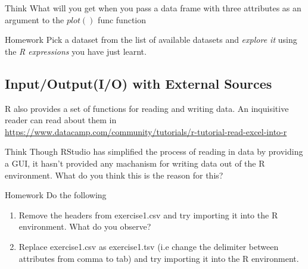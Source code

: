 \begin{DIY}{Think}
What will you get when you pass a data frame with three attributes as an argument to the $plot()$ func function
\end{DIY}

\begin{DIY}{Homework}
Pick a dataset from the list of available datasets and \emph{explore it} using the \emph{R expressions} you have just learnt.
\end{DIY}
\subsection{Input/Output(I/O) with External Sources}
\begin{HIGHLIGHT}
\par{}
R also provides a set of functions for reading and writing data. An inquisitive reader can read about them in \textcolor{cyan}{\url{https://www.datacamp.com/community/tutorials/r-tutorial-read-excel-into-r}}
\end{HIGHLIGHT}

\begin{DIY}{Think}
Though RStudio has simplified the process of reading in data by providing a GUI, it hasn't provided any machanism for writing data out of the R environment. What do you think this is the reason for this?  
\end{DIY}

\begin{DIY}{Homework}
Do the following
\begin{enumerate}
  \item Remove the headers from exercise1.csv and try importing it into the R environment. What do you observe?
  \item Replace exercise1.csv as exercise1.tsv (i.e change the delimiter between attributes from comma to tab) and try importing it into the R environment.
\end{enumerate}
\end{DIY}
